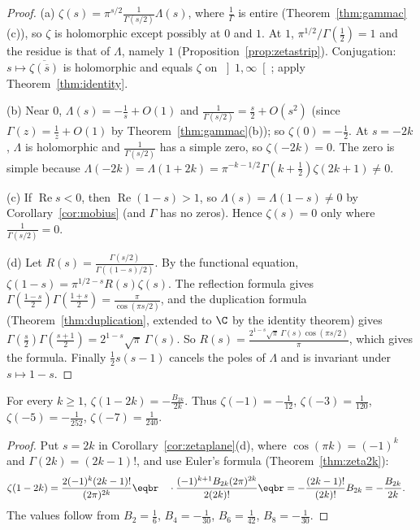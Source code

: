 \begin{proof}
(a) $\zeta(s)=\pi^{s/2}\frac1{\Gamma(s/2)}\Lambda(s)$, where $\frac1\Gamma$ is entire (Theorem~\ref{thm:gammac}(c)), so $\zeta$ is holomorphic except possibly at $0$ and $1$. At $1$,
$\pi^{1/2}/\Gamma(\frac12)=1$ and the residue is that of $\Lambda$, namely $1$ (Proposition~\ref{prop:zetastrip}). Conjugation: $s\mapsto\overline{\zeta(\overline s)}$ is holomorphic and
equals $\zeta$ on $\left]1,\infty\right[$; apply Theorem~\ref{thm:identity}.

(b) Near $0$, $\Lambda(s)=-\frac1s+O(1)$ and $\frac1{\Gamma(s/2)}=\frac s2+O(s^2)$ (since $\Gamma(z)=\frac1z+O(1)$ by Theorem~\ref{thm:gammac}(b)); so $\zeta(0)=-\frac12$. At $s=-2k$, $\Lambda$ is
holomorphic and $\frac1{\Gamma(s/2)}$ has a simple zero, so $\zeta(-2k)=0$. The zero is simple because $\Lambda(-2k)=\Lambda(1+2k)=\pi^{-k-1/2}\Gamma(k+\frac12)\zeta(2k+1)\ne0$.

(c) If $\operatorname{Re}s<0$, then $\operatorname{Re}(1-s)>1$, so $\Lambda(s)=\Lambda(1-s)\ne0$ by Corollary~\ref{cor:mobius} (and $\Gamma$ has no zeros). Hence $\zeta(s)=0$ only where $\frac1{\Gamma(s/2)}=0$.

(d) Let $R(s)=\frac{\Gamma(s/2)}{\Gamma((1-s)/2)}$. By the functional equation, $\zeta(1-s)=\pi^{1/2-s}R(s)\zeta(s)$. The reflection formula gives $\Gamma(\frac{1-s}2)\Gamma(\frac{1+s}2)=\frac\pi{\cos(\pi s/2)}$, and
the duplication formula (Theorem~\ref{thm:duplication}, extended to $\C$ by the identity theorem) gives $\Gamma(\frac s2)\Gamma(\frac{s+1}2)=2^{1-s}\sqrt\pi\,\Gamma(s)$. So
$R(s)=\frac{2^{1-s}\sqrt\pi\,\Gamma(s)\cos(\pi s/2)}\pi$, which gives the formula. Finally $\frac12s(s-1)$ cancels the poles of $\Lambda$ and is invariant under
$s\mapsto1-s$.
\end{proof}

\begin{theorem}\label{thm:zetaneg}
For every $k\ge1$, $\displaystyle\zeta(1-2k)=-\frac{B_{2k}}{2k}$. Thus $\zeta(-1)=-\frac1{12}$, $\zeta(-3)=\frac1{120}$, $\zeta(-5)=-\frac1{252}$, $\zeta(-7)=\frac1{240}$.
\end{theorem}
\begin{proof}
Put $s=2k$ in Corollary~\ref{cor:zetaplane}(d), where $\cos(\pi k)=(-1)^k$ and $\Gamma(2k)=(2k-1)!$, and use Euler's formula (Theorem~\ref{thm:zeta2k}):
\[
\begin{aligned}\zeta(1-2k)&=\frac{2(-1)^k(2k-1)!}{(2\pi)^{2k}}\eqbr\quad\cdot\frac{(-1)^{k+1}B_{2k}(2\pi)^{2k}}{2(2k)!}\eqbr=-\frac{(2k-1)!}{(2k)!}B_{2k}=-\frac{B_{2k}}{2k}.\end{aligned}
\]
The values follow from $B_2=\frac16$, $B_4=-\frac1{30}$, $B_6=\frac1{42}$, $B_8=-\frac1{30}$.
\end{proof}

